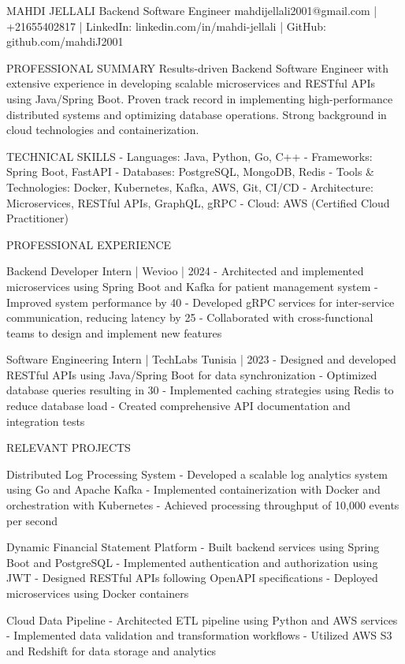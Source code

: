 MAHDI JELLALI
Backend Software Engineer
mahdijellali2001@gmail.com | +21655402817 | LinkedIn: linkedin.com/in/mahdi-jellali | GitHub: github.com/mahdiJ2001

PROFESSIONAL SUMMARY
Results-driven Backend Software Engineer with extensive experience in developing scalable microservices and RESTful APIs using Java/Spring Boot. Proven track record in implementing high-performance distributed systems and optimizing database operations. Strong background in cloud technologies and containerization.

TECHNICAL SKILLS
- Languages: Java, Python, Go, C++
- Frameworks: Spring Boot, FastAPI
- Databases: PostgreSQL, MongoDB, Redis
- Tools & Technologies: Docker, Kubernetes, Kafka, AWS, Git, CI/CD
- Architecture: Microservices, RESTful APIs, GraphQL, gRPC
- Cloud: AWS (Certified Cloud Practitioner)

PROFESSIONAL EXPERIENCE

Backend Developer Intern | Wevioo | 2024
- Architected and implemented microservices using Spring Boot and Kafka for patient management system
- Improved system performance by 40%
- Developed gRPC services for inter-service communication, reducing latency by 25%
- Collaborated with cross-functional teams to design and implement new features

Software Engineering Intern | TechLabs Tunisia | 2023
- Designed and developed RESTful APIs using Java/Spring Boot for data synchronization
- Optimized database queries resulting in 30%
- Implemented caching strategies using Redis to reduce database load
- Created comprehensive API documentation and integration tests

RELEVANT PROJECTS

Distributed Log Processing System
- Developed a scalable log analytics system using Go and Apache Kafka
- Implemented containerization with Docker and orchestration with Kubernetes
- Achieved processing throughput of 10,000 events per second

Dynamic Financial Statement Platform
- Built backend services using Spring Boot and PostgreSQL
- Implemented authentication and authorization using JWT
- Designed RESTful APIs following OpenAPI specifications
- Deployed microservices using Docker containers

Cloud Data Pipeline
- Architected ETL pipeline using Python and AWS services
- Implemented data validation and transformation workflows
- Utilized AWS S3 and Redshift for data storage and analytics

